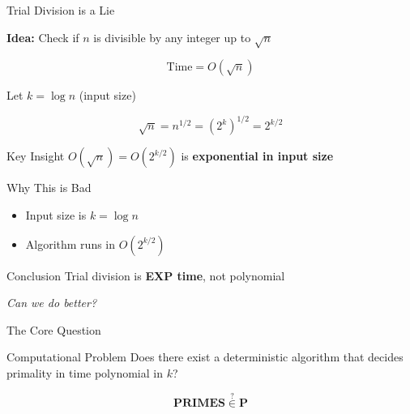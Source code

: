 \documentclass{beamer}
\begin{document}

\begin{frame}{Trial Division is a Lie}

\textbf{Idea:} Check if $n$ is divisible by any integer up to $\sqrt{n}$

\[
\text{Time} = O(\sqrt{n})
\]

\pause

Let $k = \log n$ (input size)

\[
\sqrt{n} = n^{1/2} = (2^k)^{1/2} = 2^{k/2}
\]

\pause

\begin{block}{Key Insight}
$O(\sqrt{n}) = O(2^{k/2})$ is \textbf{exponential in input size}
\end{block}

\end{frame}


\begin{frame}{Why This is Bad}

\begin{itemize}
    \item Input size is $k = \log n$
    \item Algorithm runs in $O(2^{k/2})$
\end{itemize}

\pause

\begin{block}{Conclusion}
Trial division is \textbf{EXP time}, not polynomial
\end{block}

\pause

\begin{center}
\Large
\textit{Can we do better?}
\end{center}

\end{frame}


\begin{frame}{The Core Question}

\begin{block}{Computational Problem}
Does there exist a deterministic algorithm that decides primality in time polynomial in $k$?
\end{block}

\pause

\begin{center}
\Large
\[
\textbf{PRIMES} \stackrel{?}{\in} \mathbf{P}
\]
\end{center}

\end{frame}
\end{document}

